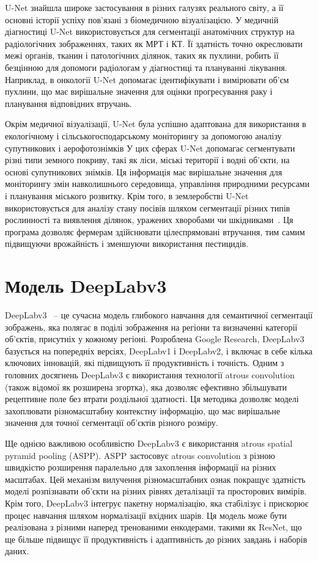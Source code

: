 U-Net знайшла широке застосування в різних галузях реального світу, а її
основні історії успіху пов'язані з біомедичною візуалізацією. У медичній
діагностиці U-Net використовується для сегментації анатомічних структур на
радіологічних зображеннях, таких як МРТ і КТ. Її здатність точно окреслювати
межі органів, тканин і патологічних ділянок, таких як пухлини, робить її
безцінною для допомоги радіологам у діагностиці та плануванні лікування.
Наприклад, в онкології U-Net допомагає ідентифікувати і вимірювати об'єм
пухлини, що має вирішальне значення для оцінки прогресування раку і планування
відповідних втручань.

Окрім медичної візуалізації, U-Net була успішно адаптована
для використання в екологічному і сільськогосподарському
моніторингу за допомогою аналізу супутникових і аерофотознімків
У цих сферах U-Net допомагає сегментувати різні типи
земного покриву, такі як ліси, міські території і водні
об'єкти, на основі супутникових знімків. Ця інформація
має вирішальне значення для моніторингу змін навколишнього
середовища, управління природними ресурсами і планування
міського розвитку. Крім того, в землеробстві U-Net
використовується для аналізу стану посівів шляхом сегментації
різних типів рослинності та виявлення ділянок, уражених
хворобами чи шкідниками~\cite{mou2018}. Ця програма дозволяє фермерам
здійснювати цілеспрямовані втручання, тим самим підвищуючи
врожайність і зменшуючи використання пестицидів.

\section{Модель DeepLabv3}

DeepLabv3~\cite{chen2017} -- це сучасна модель глибокого навчання для
семантичної сегментації зображень, яка полягає в поділі зображення на регіони
та визначенні категорії об'єктів, присутніх у кожному регіоні. Розроблена
Google Research, DeepLabv3 базується на попередніх версіях, DeepLabv1 і
DeepLabv2, і включає в себе кілька ключових інновацій, які підвищують її
продуктивність і точність. Одним з головних досягнень DeepLabv3 є використання
технології atrous convolution (також відомої як розширена згортка), яка
дозволяє ефективно збільшувати рецептивне поле без втрати роздільної здатності.
Ця методика дозволяє моделі захоплювати різномасштабну контекстну інформацію,
що має вирішальне значення для точної сегментації об'єктів різного розміру.

Ще однією важливою особливістю DeepLabv3 є використання
atrous spatial pyramid pooling (ASPP).
ASPP застосовує atrous convolution з різною швидкістю розширення
паралельно для захоплення інформації на різних масштабах. Цей
механізм вилучення різномасштабних ознак покращує здатність моделі
розпізнавати об'єкти на різних рівнях деталізації та просторових вимірів.
Крім того, DeepLabv3 інтегрує пакетну нормалізацію, яка стабілізує
і прискорює процес навчання шляхом нормалізації вхідних шарів.
Ця модель може бути реалізована з різними наперед тренованими енкодерами,
такими як ResNet, що ще більше підвищує її продуктивність
і адаптивність до різних завдань і наборів даних.

